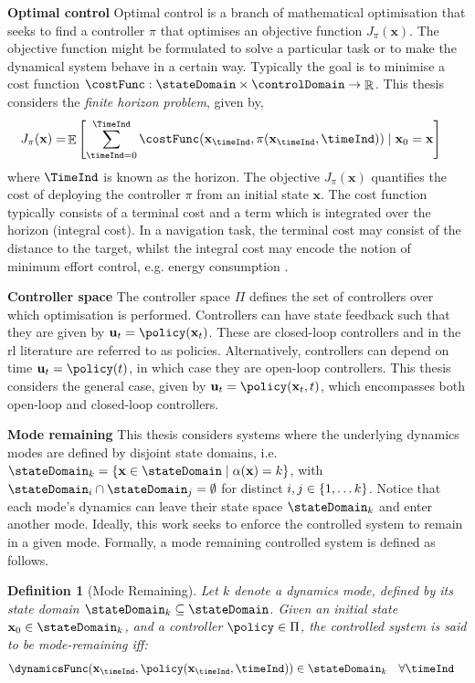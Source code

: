 \documentclass{mimosis-class/mimosis}
\newtheorem{definition}{Definition}[section]
\numberwithin{equation}{chapter}
\DeclareMathOperator{\R}{\mathbb{R}}
\DeclareMathOperator{\E}{\mathbb{E}}
\newcommand{\modeInd}{\ensuremath{k}}
\newcommand{\ModeInd}{\ensuremath{\MakeUppercase{\modeInd}}}
\newcommand{\mode}[1]{\ensuremath{#1_{\modeInd}}}
\newcommand{\state}{\ensuremath{\mathbf{x}}}
\newcommand{\control}{\ensuremath{\mathbf{u}}}
\newcommand{\x}{\ensuremath{\mathbf{x}}}
\newcommand{\modeVar}{\ensuremath{\alpha}}
\begin{document}
\textbf{Optimal control}
Optimal control is a branch of mathematical optimisation that seeks to find a controller \(\pi\) that
optimises an objective function \(J_{\pi}(\x)\).
The objective function might be formulated to solve a particular task or to make the dynamical
system behave in a certain way.
Typically the goal is to minimise a cost function \(\costFunc : \stateDomain \times \controlDomain \rightarrow \R\).
This thesis considers the \emph{finite horizon problem}, given by,
\begin{align} \label{eq-optimal-control-objective}
J_{\pi}(\state) = &\E \left[ \sum_{\timeInd=0}^{\TimeInd} \costFunc(\state_{\timeInd}, \pi(\state_{\timeInd}, \timeInd))
\mid \state_0=\state \right]
\end{align}
where \(\TimeInd\) is known as the horizon.
The objective \(J_{\pi}(\state)\) quantifies the cost of deploying the controller \(\pi\) from
an initial state \(\state\).
The cost function typically consists of a terminal cost and a term which is integrated over the horizon (integral cost).
In a navigation task, the terminal cost may consist of the distance to the target, whilst the integral cost
may encode the notion of minimum effort control, e.g. energy consumption \citep{kirkOptimal2004}.

\textbf{Controller space}
The controller space \(\Pi\) defines the set of controllers over which optimisation is performed.
Controllers can have state feedback such that they are given by \(\control_t = \policy(\state_t)\).
These are closed-loop controllers and in the \acrshort{rl} literature are referred to as policies.
Alternatively, controllers can depend on time \(\control_t = \policy(t)\), in which case they are open-loop controllers.
This thesis considers the general case, given by \(\control_t = \policy(\state_t, t)\),
which encompasses both open-loop and closed-loop controllers.

\textbf{Mode remaining}
This thesis considers systems where the underlying dynamics modes are defined by disjoint state domains, i.e.
\(\mode{\stateDomain} = \{ \state \in \stateDomain \mid \modeVar(\state) = \modeInd \}\), with
\(\stateDomain_{i} \cap \stateDomain_{j} = \emptyset\) for distinct \(i, j \in \{1, \ldots \ModeInd\}\).
Notice that each mode's dynamics can leave their state space \(\mode{\stateDomain}\)
and enter another mode.
Ideally, this work seeks to enforce the controlled system to remain in a given mode.
Formally, a mode remaining controlled system is defined as follows.
\begin{definition}[Mode Remaining] \label{def-mode-remaining-main}
Let $\modeInd$ denote a dynamics mode, defined by its state domain $\mode{\stateDomain} \subseteq \stateDomain$.
Given an initial state $\state_0 \in \mode{\stateDomain}$, and a controller $\policy \in \Pi$,
the controlled system is said to be mode-remaining iff:
\begin{align} \label{eq-mode-remaining-def-main}
\dynamicsFunc(\state_{\timeInd}, \policy(\state_{\timeInd}, \timeInd))
&\in \mode{\stateDomain} \quad \forall \timeInd
\end{align}
\end{definition}
\end{document}
